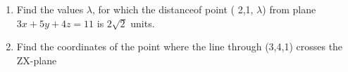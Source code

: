 \begin{enumerate}
\item Find the values $\lambda$, for which the distanceof point ( 2,1, $\lambda$) from plane $3x+5y+4z=11$ is  $2\sqrt{2}$ units.
\item Find the coordinates of the point where the line through (3,4,1) crosses the ZX-plane
\end{enumerate}
